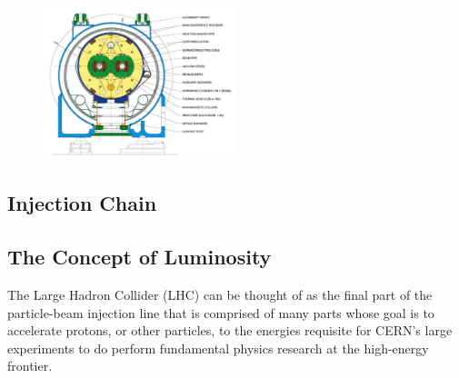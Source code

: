 \begin{figure}[!htb]
    \begin{center}
        \includegraphics[width=0.5\textwidth]{figures/chapter2/lhc_dipole_fig3p3}
        \caption{
        }
        \label{fig:lhc_dipole_xsec}
    \end{center}
\end{figure}

\subsection{Injection Chain}
\label{sec:lhc_injection}

\subsection{The Concept of Luminosity}
\label{sec:lhc_luminosity}

The Large Hadron Collider (LHC) can be thought of as the final part of the particle-beam injection line
that is comprised of many parts whose goal is to accelerate protons, or other particles, to
the energies requisite for CERN's large experiments to do perform fundamental physics research
at the high-energy frontier.
